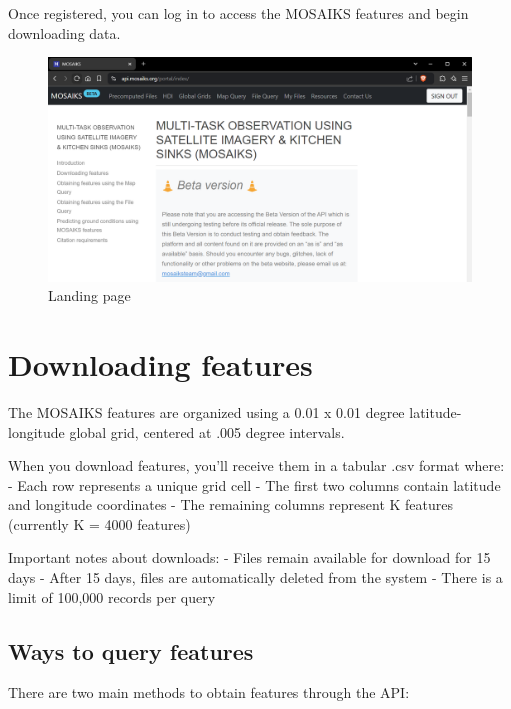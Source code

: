 \documentclass[
  letterpaper,
  DIV=11,
  numbers=noendperiod]{scrreprt}
\begin{document}
Once registered, you can log in to access the MOSAIKS features and begin
downloading data.

\begin{figure}

{\centering \includegraphics{images/api-landing.png}

}

\caption{Landing page}

\end{figure}

\hypertarget{downloading-features}{%
\section{Downloading features}\label{downloading-features}}

The MOSAIKS features are organized using a 0.01 x 0.01 degree
latitude-longitude global grid, centered at .005 degree intervals.

When you download features, you'll receive them in a tabular .csv format
where: - Each row represents a unique grid cell - The first two columns
contain latitude and longitude coordinates - The remaining columns
represent K features (currently K = 4000 features)

Important notes about downloads: - Files remain available for download
for 15 days - After 15 days, files are automatically deleted from the
system - There is a limit of 100,000 records per query

\hypertarget{ways-to-query-features}{%
\subsection{Ways to query features}\label{ways-to-query-features}}

There are two main methods to obtain features through the API:
\end{document}
